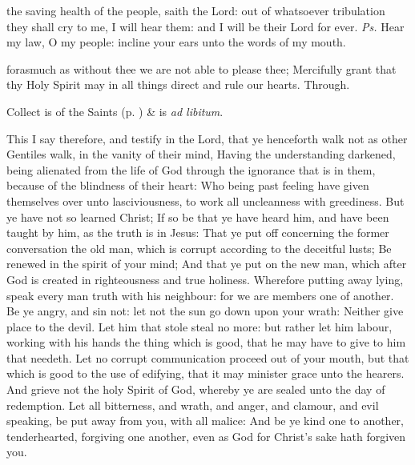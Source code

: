 


\properantiphonfix

\introit
{} the saving health of the people, saith the Lord: out of whatsoever tribulation they shall cry to me, I will hear them: and I will be their Lord for ever. \textit{Ps.} Hear my law, O my people: incline your ears unto the words of my mouth.

\collect
{} forasmuch as without thee we are not able to please thee; Mercifully grant that thy Holy Spirit may in all things direct and rule our hearts. Through.
\begin{rubric}
     Collect is of the Saints (p. \pageref{SPSaints}) \&  is \emph{ad libitum}.
\end{rubric}

 This I say therefore, and testify in the Lord, that ye henceforth walk not as other Gentiles walk, in the vanity of their mind, Having the understanding darkened, being alienated from the life of God through the ignorance that is in them, because of the blindness of their heart: Who being past feeling have given themselves over unto lasciviousness, to work all uncleanness with greediness. But ye have not so learned Christ; If so be that ye have heard him, and have been taught by him, as the truth is in Jesus: That ye put off concerning the former conversation the old man, which is corrupt according to the deceitful lusts; Be renewed in the spirit of your mind; And that ye put on the new man, which after God is created in righteousness and true holiness. Wherefore putting away lying, speak every man truth with his neighbour: for we are members one of another. Be ye angry, and sin not: let not the sun go down upon your wrath: Neither give place to the devil. Let him that stole steal no more: but rather let him labour, working with his hands the thing which is good, that he may have to give to him that needeth. Let no corrupt communication proceed out of your mouth, but that which is good to the use of edifying, that it may minister grace unto the hearers. And grieve not the holy Spirit of God, whereby ye are sealed unto the day of redemption. Let all bitterness, and wrath, and anger, and clamour, and evil speaking, be put away from you, with all malice: And be ye kind one to another, tenderhearted, forgiving one another, even as God for Christ's sake hath forgiven you.

